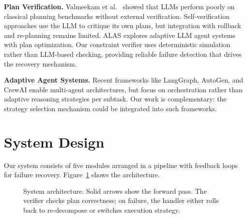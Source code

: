 \documentclass{article}
\begin{document}
\textbf{Plan Verification.} Valmeekam et al.~\citep{valmeekam2023planning} showed that LLMs perform poorly on classical planning benchmarks without external verification. Self-verification approaches use the LLM to critique its own plans, but integration with rollback and re-planning remains limited. ALAS explores adaptive LLM agent systems with plan optimization. Our constraint verifier uses deterministic simulation rather than LLM-based checking, providing reliable failure detection that drives the recovery mechanism.

\textbf{Adaptive Agent Systems.} Recent frameworks like LangGraph, AutoGen, and CrewAI enable multi-agent architectures, but focus on orchestration rather than adaptive reasoning strategies per subtask. Our work is complementary: the strategy selection mechanism could be integrated into such frameworks.

\section{System Design}

Our system consists of five modules arranged in a pipeline with feedback loops for failure recovery. Figure~\ref{fig:arch} shows the architecture.

\begin{figure}[h]
\centering
{}
\caption{System architecture. Solid arrows show the forward pass. The verifier checks plan correctness; on failure, the handler either rolls back to re-decompose or switches execution strategy.}
\label{fig:arch}
\end{figure}
\end{document}
